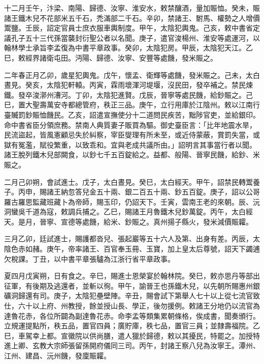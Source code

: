 \begin{pinyinscope}
 十二月壬午，汴梁、南陽、歸德、汝寧、淮安水，敕禁釀酒，量加賑恤。癸未，賑諸王鐵木兒不花部米五千石，禿滿部二千石。辛卯，禁諸王、駙馬、權勢之人增價鬻鹽。壬辰，詔定官員士庶衣服車輿制度。甲午，太陰犯輿鬼。己亥，敕中書省定議孔子五十三代孫當襲封衍聖公者以名聞。庚子，遣官浚楊州、淮安等處運河，以翰林學士承旨李孟復為中書平章政事。癸卯，太陰犯房。甲辰，太陰犯天江。乙巳，敕經界諸衛屯田。沔陽、歸德、汝寧、安豐等處饑，發米賑之。



 二年春正月乙卯，歲星犯輿鬼。戊午，懷孟、衛輝等處饑，發米賑之。己未，太白晝見。癸亥，太陰犯軒轅。丙寅，霖雨壞渾河堤堰，沒民田，發卒補之。禁民煉鐵。發卒浚漷州漕河。丁卯，太陰犯進賢。戊辰，晉寧等處民饑，給鈔賑之。己巳，置大聖壽萬安寺都總管府，秩正三品。庚午，立行用庫於江陰州。敕以江南行臺贓罰鈔賑恤饑民。乙亥，詔遣宣撫使分十二道問民疾苦，黜陟官吏，並給銀印。命中書省臣分領庶務。禁南人典質妻子販買為驅。御史臺臣言：「比年地震水旱，民流盜起，皆風憲顧忌失於糾察，宰臣燮理有所未至，或近侍蒙蔽，賞罰失當，或獄有冤濫，賦役繁重，以致乖和。宜與老成共議所由。」詔明言其事當行者以聞。諸王脫列鐵木兒部闕食，以鈔七千五百錠給之。益都、般陽、晉寧民饑，給鈔、米賑之。



 二月己卯朔，會試進士。戊子，太白晝見。癸巳，太白經天。甲午，詔禁民轉鬻養子。丙申，賜諸王納忽答兒金五十兩、銀二百五十兩、鈔五百錠。庚子，詔以公哥羅古羅思監藏班藏卜為帝師，賜玉印，仍詔天下。壬寅，雲南王老的來朝。辰、沅洞蠻吳千道為寇，敕調兵捕之。乙巳，賜諸王月魯鐵木兒鈔萬錠。丙午，太白經天。是月，晉寧、宣德等處饑，給米、鈔賑之。真州揚子縣火，發米減價賑糶。



 三月乙卯，廷試進士，賜護都沓兒、張起巖等五十六人及第、出身有差。丙辰，太陰色赤如赭。庚午，帝率諸王、百官奉玉冊、玉寶，加上皇太后尊號，詔天下蠲逋欠稅課。丁丑，以中書平章張驢為江浙行省平章政事。



 夏四月戊寅朔，日有食之。辛巳，賜進士恩榮宴於翰林院。癸巳，敕亦思丹等部出征軍，有後期及逃還者，並斬以徇。甲午，諭晉王也孫鐵木兒，以先朝所賜惠州銀礦洞歸還有司。庚子，太陰犯壘壁陣。辛丑，賜會試下第舉人七十以上從七流官致仕，六十以上府、州教授，餘並授山長、學正，後勿援例。敕諸王分地仍以流官為達魯花赤，各位所闢為副達魯花赤。命李孟等類集累朝條格，俟成書，聞奏頒行。立規運提點所，秩五品，置官四員；廣貯庫，秩七品，置官三員；並隸壽福院。乙巳，車駕幸上都。宣徽院以供尚膳，遣人獵於歸德，敕以其擾民，特罷之。加授特進上卿、玄教大宗師張留孫開府儀同三司。丙午，封諸王察八兒為汝寧王。潭州、江州、建昌、沅州饑，發廩賑糶。




\end{pinyinscope}
